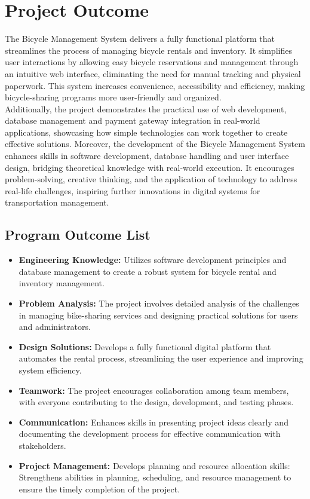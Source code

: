 \section{Project Outcome}
The Bicycle Management System delivers a fully functional platform that streamlines the process of managing bicycle rentals and inventory. It simplifies user interactions by allowing easy bicycle reservations and management through an intuitive web interface, eliminating the need for manual tracking and physical paperwork. This system increases convenience, accessibility and efficiency, making bicycle-sharing programs more user-friendly and organized.\\
Additionally, the project demonstrates the practical use of web development, database management and payment gateway integration in real-world applications, showcasing how simple technologies can work together to create effective solutions. Moreover, the development of the Bicycle Management System enhances skills in software development, database handling and user interface design, bridging theoretical knowledge with real-world execution. It encourages problem-solving, creative thinking, and the application of technology to address real-life challenges, inspiring further innovations in digital systems for transportation management.\cite{1.6}

\subsection{Program Outcome List}
\begin{itemize}
    \item \textbf{Engineering Knowledge:} Utilizes software development principles and database management to create a robust system for bicycle rental and inventory management.
\item \textbf{Problem Analysis:} The project involves detailed analysis of the challenges in managing bike-sharing services and designing practical solutions for users and administrators.
\item \textbf{Design Solutions:} Develops a fully functional digital platform that automates the rental process, streamlining the user experience and improving system efficiency.
\item \textbf{Teamwork:} The project encourages collaboration among team members, with everyone contributing to the design, development, and testing phases.
\item \textbf{Communication:} Enhances skills in presenting project ideas clearly and documenting the development process for effective communication with stakeholders.
\item \textbf{Project Management:} Develops planning and resource allocation skills: Strengthens abilities in planning, scheduling, and resource management to ensure the timely completion of the project.
\end{itemize}

